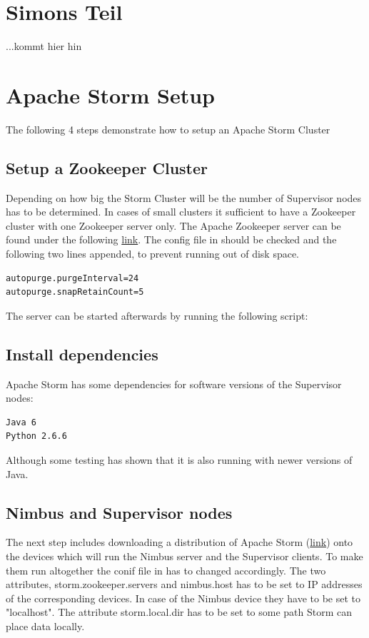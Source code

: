 \documentclass[12pt,a4paper]{article}
\begin{document}
\section{Simons Teil}
\label{sec:Simons Teil}

...kommt hier hin

\section{Apache Storm Setup}
The following 4 steps demonstrate how to setup an Apache Storm Cluster
\subsection{Setup a Zookeeper Cluster}
Depending on how big the Storm Cluster will be the number of Supervisor nodes has to be determined. In cases of small clusters it sufficient to have a Zookeeper cluster with one Zookeeper server only.
The Apache Zookeeper server can be found under the following \href{http://www.eu.apache.org/dist/zookeeper/stable/}{link}. The config file in  should be checked and the following two lines appended, to prevent running out of disk space.
\begin{verbatim}
autopurge.purgeInterval=24
autopurge.snapRetainCount=5  
\end{verbatim}
The server can be started afterwards by running the following script: 
\subsection{Install dependencies}
Apache Storm has some dependencies for software versions of the Supervisor nodes:
\begin{verbatim}
Java 6
Python 2.6.6
\end{verbatim}
Although some testing has shown that it is also running with newer versions of Java.
\subsection{Nimbus and Supervisor nodes}
The next step includes downloading a distribution of Apache Storm (\href{http://storm.apache.org/downloads.html}{link}) onto the devices which will run the Nimbus server and the Supervisor clients.
To make them run altogether the conif file in  has to changed accordingly. The two attributes, storm.zookeeper.servers and nimbus.host has to be set to IP addresses of the corresponding devices. In case of the Nimbus device they have to be set to "localhost". The attribute storm.local.dir has to be set to some path Storm can place data locally.
\end{document}
